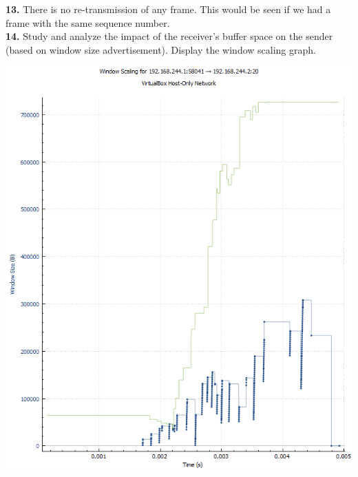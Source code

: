 \documentclass[12pt]{extarticle}
\begin{document}
\textbf{13.} There is no re-transmission of any frame. This would be seen if we had a frame with the same sequence number.\\

\textbf{14.} Study and analyze the impact of the receiver's buffer space on the sender (based on window size advertisement). Display the window scaling graph.
\begin{center}
\includegraphics[scale=0.7]{resources/5-6-1.png}
\end{center}
\end{document}
